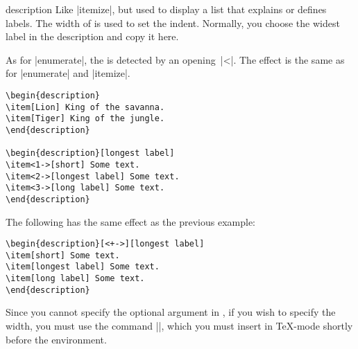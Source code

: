 \begin{environment}{{description}} 
  Like |itemize|, but used to display a list that explains or defines
  labels. The width of  is used to set the indent. Normally,
  you choose the widest label in the description and copy it here.

  As for |enumerate|, the  is
  detected by an opening~|<|. The effect is the same as for
  |enumerate| and |itemize|.
  \example
\begin{verbatim}
\begin{description}
\item[Lion] King of the savanna.
\item[Tiger] King of the jungle.
\end{description}

\begin{description}[longest label]
\item<1->[short] Some text.
\item<2->[longest label] Some text.
\item<3->[long label] Some text.
\end{description}
\end{verbatim}

  \example The following has the same effect as the previous example:
\begin{verbatim}
\begin{description}[<+->][longest label]
\item[short] Some text.
\item[longest label] Some text.
\item[long label] Some text.
\end{description}
\end{verbatim}

  \lyxnote
  Since you cannot specify the optional argument in \LyX, if you wish
  to specify the width, you must use the command
  |\usedescriptionitemofwidthas|, which you must insert in \TeX-mode
  shortly before the environment.
\end{environment}


